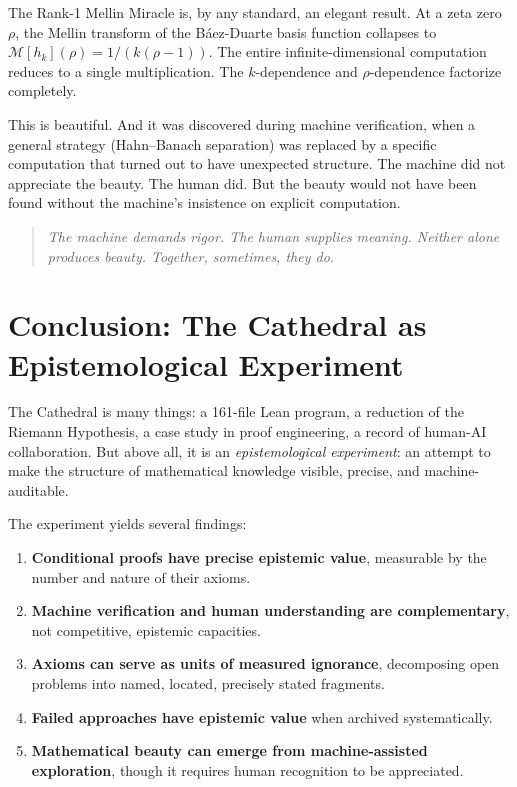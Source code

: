\documentclass[11pt,a4paper]{article}
\begin{document}
The Rank-1 Mellin Miracle is, by any standard, an elegant result.
At a zeta zero $\rho$, the Mellin transform of the B\'aez-Duarte
basis function collapses to $\mathcal{M}[h_k](\rho) = 1/(k(\rho-1))$.
The entire infinite-dimensional computation reduces to a single
multiplication. The $k$-dependence and $\rho$-dependence factorize
completely.

This is beautiful. And it was discovered during machine verification,
when a general strategy (Hahn--Banach separation) was replaced by a
specific computation that turned out to have unexpected structure.
The machine did not appreciate the beauty. The human did. But the
beauty would not have been found without the machine's insistence
on explicit computation.

\begin{quote}
\emph{The machine demands rigor. The human supplies meaning.
Neither alone produces beauty. Together, sometimes, they do.}
\end{quote}

\section{Conclusion: The Cathedral as Epistemological Experiment}

The Cathedral is many things: a 161-file Lean program, a reduction
of the Riemann Hypothesis, a case study in proof engineering, a
record of human-AI collaboration. But above all, it is an
\emph{epistemological experiment}: an attempt to make the structure
of mathematical knowledge visible, precise, and machine-auditable.

The experiment yields several findings:

\begin{enumerate}
  \item \textbf{Conditional proofs have precise epistemic value},
    measurable by the number and nature of their axioms.
  \item \textbf{Machine verification and human understanding are
    complementary}, not competitive, epistemic capacities.
  \item \textbf{Axioms can serve as units of measured ignorance},
    decomposing open problems into named, located, precisely
    stated fragments.
  \item \textbf{Failed approaches have epistemic value} when
    archived systematically.
  \item \textbf{Mathematical beauty can emerge from machine-assisted
    exploration}, though it requires human recognition to be
    appreciated.
\end{enumerate}
\end{document}
